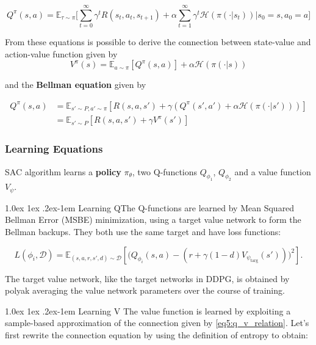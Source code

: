 \documentclass[a4paper, 11pt]{article}
\makeatletter
\renewcommand{\paragraph}{%
	\@startsection{paragraph}{4}%
	{\z@}{1.0ex \@plus 1ex \@minus .2ex}{-1em}%
	{\normalfont\normalsize\bfseries}%
}
\makeatother
\begin{document}
	\begin{equation} \label{eq4:action_value}
	Q^\pi(s,a) = \mathbb{E}_{\tau \sim \pi}\Bigg[\sum_{t=0}^{\infty} \gamma^t R(s_t, a_t, s_{t+1}) + \alpha \sum_{t=1}^{\infty} \gamma^t \mathcal{H}(\pi(\cdot|s_t))\bigg|s_0 = s, a_0 =a\Bigg]
	\end{equation}	
	
	From these equations is possible to derive the connection between state-value and action-value function given by
	\begin{equation} \label{eq5:q_v_relation}
	V^\pi(s) = \mathbb{E}_{a\sim\pi}[Q^\pi(s,a)] + \alpha \mathcal{H}(\pi(\cdot|s))
	\end{equation}
	
	and the \textbf{Bellman equation} given by

	\begin{align} 	\label{eq6:bellman}
	Q^\pi(s,a) &= \mathbb{E}_{s'\sim P, a'\sim\pi}[R(s,a,s') + \gamma(Q^\pi(s',a') + \alpha \mathcal{H}(\pi(\cdot|s')))]\\
	&= \mathbb{E}_{s'\sim P}[R(s,a,s') + \gamma V^\pi(s')]
	\end{align}
	
	\subsubsection{Learning Equations}
	SAC algorithm learns a \textbf{policy} $\pi_\theta$, two Q-functions $Q_{\phi_1}$,  $Q_{\phi_2}$ and a value function $V_\psi$.
	
	\paragraph{Learning Q}The Q-functions are learned by Mean Squared Bellman Error (MSBE) minimization, using a target value network to form the Bellman backups. They both use the same target and have loss functions:
	
	\begin{equation}
	L(\phi_i, {\mathcal D}) = \mathbb{E}_{(s,a,r,s',d) \sim \mathcal D}\left[ \Bigg( Q_{\phi_i}(s,a) - \left(r + \gamma (1 - d) V_{\psi_{\text{targ}}}(s') \right) \Bigg)^2 \right].
	\end{equation}
	
	
	The target value network, like the target networks in DDPG, is obtained by polyak averaging the value network parameters over the course of training.
	
	\paragraph{Learning V} The value function is learned by exploiting a sample-based approximation of the connection  given by \vref{eq5:q_v_relation}. Let’s first rewrite the connection equation by using the definition of entropy to obtain:
	
\end{document}
